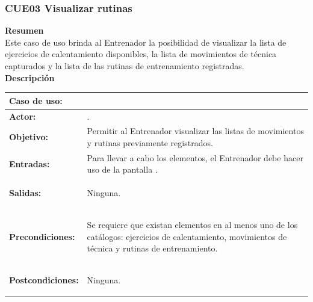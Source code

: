 \subsubsection{CUE03 Visualizar rutinas}
\label{cu:CUE03}

\textbf{\textcolor[rgb]{0, 0, 0.545098}{Resumen}} \\

Este caso de uso brinda al Entrenador la posibilidad de visualizar la lista de ejercicios de calentamiento disponibles, la lista de movimientos de técnica capturados y la lista de las rutinas de entrenamiento registradas.\\

\textbf{\textcolor[rgb]{0, 0, 0.545098}{Descripción}}

\begin{table}[H]
\centering
\begin{tabular}{| l | p{12 cm} |}
\hline
\rowcolor[rgb]{0.529412, 0.807843, 0.980392} {\textbf{Caso de uso:}} & \hspace{7em}{\textbf{CUE03 Visualizar rutinas}}\\
\hline
\textbf{Actor:} &  \nameref{act:Entrenador}. \\
\hline
\textbf{Objetivo:} & Permitir al Entrenador visualizar las listas de movimientos y rutinas previamente registrados.\\
\hline
\textbf{Entradas:} & Para llevar a cabo los elementos, el Entrenador debe hacer uso de la pantalla \nameref{pant:IUE03}. \\
\hline
\textbf{Salidas:} & \vspace{-2mm}	%
					\begin{compactitem}
						\setlength\itemsep{-0.25em}
						\item Ninguna.
					\end{compactitem}\\
\hline
\textbf{Precondiciones:} & 	\vspace{-2mm}	%
							\begin{compactitem}
								\setlength\itemsep{-0.25em}
								\item Se requiere que existan elementos en al menos uno de los catálogos: ejercicios de calentamiento, movimientos de técnica y rutinas de entrenamiento.
							\end{compactitem}\\
\hline
\textbf{Postcondiciones:} & \vspace{-2mm}	%
							\begin{compactitem}
								\item Ninguna.
							\end{compactitem}\\
							

\end{tabular}
\end{table}
